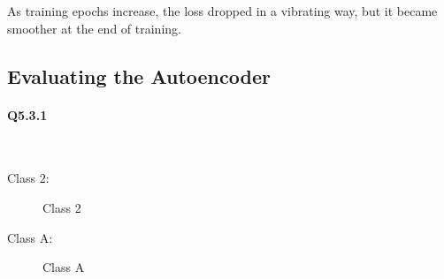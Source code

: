 \documentclass[11pt]{article} \usepackage{fullpage} \usepackage{graphicx} \usepackage{epstopdf} \usepackage{color} \usepackage{psfrag} \usepackage{pdfsync}\usepackage{indentfirst}\usepackage{subfigure}\usepackage{float}\usepackage[section]{placeins}
\begin{document}
As training epochs increase, the loss dropped in a vibrating way, but it became smoother at the end of training.

\subsection{Evaluating the Autoencoder}
\paragraph{Q5.3.1}~{}

Class $2$:
\begin{figure}[H]
\centering
{}
\caption{Class 2}
\end{figure}

Class $\mathrm{A}$:
\begin{figure}[H]
\centering
{}
\caption{Class A}
\end{figure}
\end{document}
